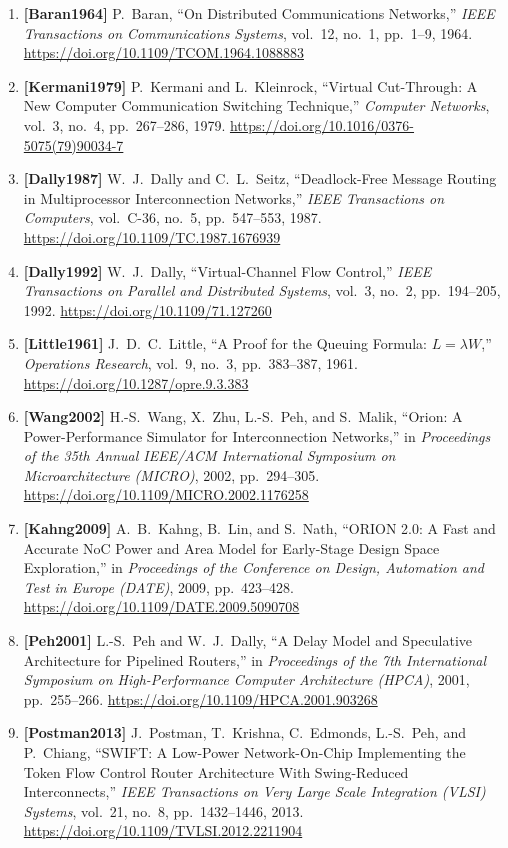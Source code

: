 \begin{enumerate}
    \item \textbf{[Baran1964]} P.~Baran, ``On Distributed Communications Networks,'' \emph{IEEE Transactions on Communications Systems}, vol.~12, no.~1, pp.~1--9, 1964. \url{https://doi.org/10.1109/TCOM.1964.1088883}
    \item \textbf{[Kermani1979]} P.~Kermani and L.~Kleinrock, ``Virtual Cut-Through: A New Computer Communication Switching Technique,'' \emph{Computer Networks}, vol.~3, no.~4, pp.~267--286, 1979. \url{https://doi.org/10.1016/0376-5075(79)90034-7}
    \item \textbf{[Dally1987]} W.~J.~Dally and C.~L.~Seitz, ``Deadlock-Free Message Routing in Multiprocessor Interconnection Networks,'' \emph{IEEE Transactions on Computers}, vol.~C-36, no.~5, pp.~547--553, 1987. \url{https://doi.org/10.1109/TC.1987.1676939}
    \item \textbf{[Dally1992]} W.~J.~Dally, ``Virtual-Channel Flow Control,'' \emph{IEEE Transactions on Parallel and Distributed Systems}, vol.~3, no.~2, pp.~194--205, 1992. \url{https://doi.org/10.1109/71.127260}
    \item \textbf{[Little1961]} J.~D.~C.~Little, ``A Proof for the Queuing Formula: $L = \lambda W$,'' \emph{Operations Research}, vol.~9, no.~3, pp.~383--387, 1961. \url{https://doi.org/10.1287/opre.9.3.383}
    \item \textbf{[Wang2002]} H.-S.~Wang, X.~Zhu, L.-S.~Peh, and S.~Malik, ``Orion: A Power-Performance Simulator for Interconnection Networks,'' in \emph{Proceedings of the 35th Annual IEEE/ACM International Symposium on Microarchitecture (MICRO)}, 2002, pp.~294--305. \url{https://doi.org/10.1109/MICRO.2002.1176258}
    \item \textbf{[Kahng2009]} A.~B.~Kahng, B.~Lin, and S.~Nath, ``ORION 2.0: A Fast and Accurate NoC Power and Area Model for Early-Stage Design Space Exploration,'' in \emph{Proceedings of the Conference on Design, Automation and Test in Europe (DATE)}, 2009, pp.~423--428. \url{https://doi.org/10.1109/DATE.2009.5090708}
    \item \textbf{[Peh2001]} L.-S.~Peh and W.~J.~Dally, ``A Delay Model and Speculative Architecture for Pipelined Routers,'' in \emph{Proceedings of the 7th International Symposium on High-Performance Computer Architecture (HPCA)}, 2001, pp.~255--266. \url{https://doi.org/10.1109/HPCA.2001.903268}
    \item \textbf{[Postman2013]} J.~Postman, T.~Krishna, C.~Edmonds, L.-S.~Peh, and P.~Chiang, ``SWIFT: A Low-Power Network-On-Chip Implementing the Token Flow Control Router Architecture With Swing-Reduced Interconnects,'' \emph{IEEE Transactions on Very Large Scale Integration (VLSI) Systems}, vol.~21, no.~8, pp.~1432--1446, 2013. \url{https://doi.org/10.1109/TVLSI.2012.2211904}

\end{enumerate}
